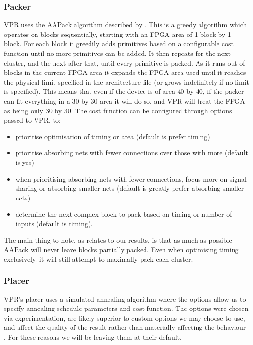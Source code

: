 \documentclass[12pt,drafta4paper,oneside]{memoir} %
\begin{document}
\subsubsection{Packer}
\ac{VPR} uses the AAPack algorithm described by \cite{AAPackThesis}. This is a greedy algorithm which operates on blocks sequentially, starting with an \ac{FPGA} area of 1 block by 1 block. For each block it greedily adds primitives based on a configurable cost function until no more primitives can be added. It then repeats for the next cluster, and the next after that, until every primitive is packed. As it runs out of blocks in the current \ac{FPGA} area it expands the \ac{FPGA} area used until it reaches the physical limit specified in the architecture file (or grows indefinitely if no limit is specified). This means that even if the device is of area 40 by 40, if the packer can fit everything in a 30 by 30 area it will do so, and \ac{VPR} will treat the \ac{FPGA} as being only 30 by 30.
The cost function can be configured through options passed to \ac{VPR}, to\cite{VPRManual}:
\begin{itemize}
 \item prioritise optimisation of timing or area (default is prefer timing)
 \item prioritise absorbing nets with fewer connections over those with more (default is yes)
 \item when prioritising absorbing nets with fewer connections, focus more on signal sharing or absorbing smaller nets (default is greatly prefer absorbing smaller nets)
 \item determine the next complex block to pack based on timing or number of inputs (default is timing).
\end{itemize}
The main thing to note, as relates to our results, is that as much as possible AAPack will never leave blocks partially packed. Even when optimising timing exclusively, it will still attempt to maximally pack each cluster.

\subsubsection{Placer}
\ac{VPR}'s placer uses a simulated annealing algorithm where the options allow us to specify annealing schedule parameters and cost function. The options were chosen via experimentation, are likely superior to custom options we may choose to use, and affect the quality of the result rather than materially affecting the behaviour \cite{VPRManual, VPRBook}. For these reasons we will be leaving them at their default.
\end{document}
